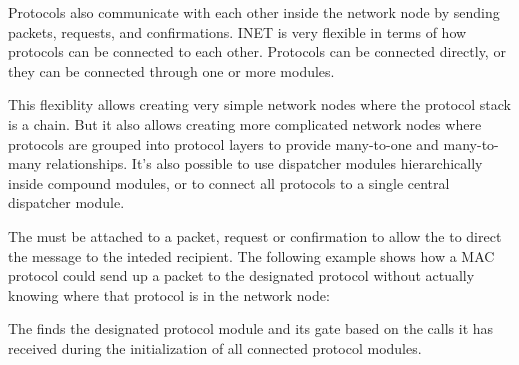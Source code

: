 Protocols also communicate with each other inside the network node by sending
packets, requests, and confirmations. INET is very flexible in terms of how
protocols can be connected to each other. Protocols can be connected directly,
or they can be connected through one or more 
modules.

This flexiblity allows creating very simple network nodes where the protocol
stack is a chain. But it also allows creating more complicated network nodes
where protocols are grouped into protocol layers to provide many-to-one and
many-to-many relationships. It's also possible to use dispatcher modules
hierarchically inside compound modules, or to connect all protocols to a single
central dispatcher module.

The  must be attached to a packet, request or
confirmation to allow the  to direct the message to
the inteded recipient. The following example shows how a MAC protocol could send
up a packet to the designated protocol without actually knowing where that
protocol is in the network node:


The  finds the designated protocol module and its
gate based on the  calls it has received during the
initialization of all connected protocol modules.




